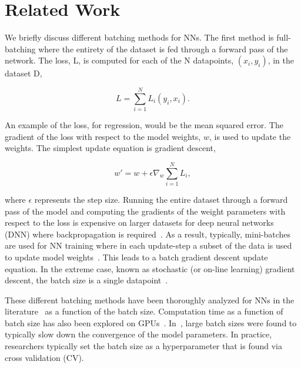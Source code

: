 \section{Related Work}
We briefly discuss different batching methods for NNs. The first method is full-batching where the entirety of the dataset is fed through a forward pass of the network. The loss, L, is computed for each of the N datapoints, $(x_i, y_i)$, in the dataset D,

\begin{equation}
\label{eq:full_batch_loss}
L = \sum_{i=1}^{N} L_i(y_i, x_i).
\end{equation}

An example of the loss, for regression, would be the mean squared error. The gradient of the loss with respect to the model weights, $w$, is used to update the weights. The simplest update equation is gradient descent,

\begin{equation}
\label{eq:update_weights}
w' = w + \epsilon \nabla_{w} \sum_{i=1}^{N} L_i,
\end{equation}

where $\epsilon$ represents the step size. Running the entire dataset through a forward pass of the model and computing the gradients of the weight parameters with respect to the loss is expensive on larger datasets for deep neural networks (DNN) where backpropagation is required~\cite{hastie2009elements}. As a result, typically, mini-batches are used for NN training where in each update-step a subset of the data is used to update model weights~\cite{bishop2006pattern}. This leads to a batch gradient descent update equation. In the extreme case, known as stochastic (or on-line learning) gradient descent, the batch size is a single datapoint~\cite{bottou1991stochastic}.

These different batching methods have been thoroughly analyzed for NNs in the literature~\cite{bottou2007tradeoffs} as a function of the batch size. Computation time as a function of batch size has also been explored on GPUs~\cite{kochura2019batch}. In~\cite{byrd2012sample}, large batch sizes were found to typically slow down the convergence of the model parameters. In practice, researchers typically set the batch size as a hyperparameter that is found via cross validation (CV).


